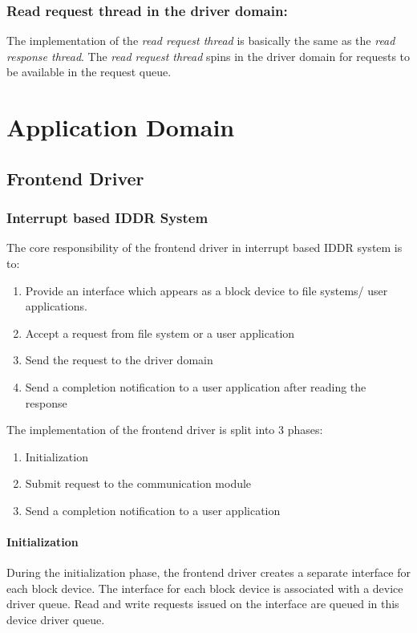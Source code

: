 \subsubsection*{Read request thread in the driver domain:}
The implementation of the \textit{read request thread} is basically 
the same as the \textit{read response thread}. The \textit{read request thread}
spins in the driver domain for requests to be available in the request queue.


\section{Application Domain}

\subsection{Frontend Driver}
\subsubsection*{Interrupt based IDDR System}
The core responsibility of the frontend driver in interrupt based IDDR system is to:
\begin{enumerate}
\item Provide an interface which appears as a block device to file systems/ user applications.
\item Accept a request from file system or a user application
\item Send the request to the driver domain
\item Send a completion notification to a user application after reading the response
\end{enumerate}

The implementation of the frontend driver is split into 3 phases: 
\begin{enumerate}
\item Initialization
\item Submit request to the communication module
\item Send a completion notification to a user application
\end{enumerate}

\paragraph{Initialization}
During the initialization phase, the frontend driver creates a separate
interface for each block device. The interface for each block device is
associated with a device driver queue. Read and write requests issued
on the interface are queued in this device driver queue.

